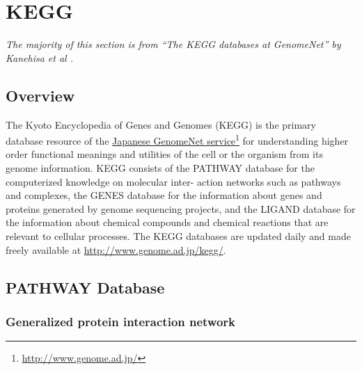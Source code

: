 \section{KEGG}
\label{sect:background_kegg}

\emph{The majority of this section is from ``The KEGG databases at GenomeNet'' by
Kanehisa et al \cite{kegg-basic}.}

\subsection{Overview}
\label{sect:background_kegg_overview}

The Kyoto Encyclopedia of Genes and Genomes (KEGG) is the primary database
resource of the \href{http://www.genome.ad.jp/}{Japanese GenomeNet
service}\footnote{\url{http://www.genome.ad.jp/}} for understanding higher order
functional meanings and utilities of the cell or the organism from its genome
information. KEGG consists of the PATHWAY database for the computerized
knowledge on molecular inter- action networks such as pathways and complexes,
the GENES database for the information about genes and proteins generated by
genome sequencing projects, and the LIGAND database for the information about
chemical compounds and chemical reactions that are relevant to cellular
processes. The KEGG databases are updated daily and made freely available at
\url{http://www.genome.ad.jp/kegg/}.

\subsection{PATHWAY Database}
\label{sect:background_kegg_pathway_database}

\subsubsection{Generalized protein interaction network}

